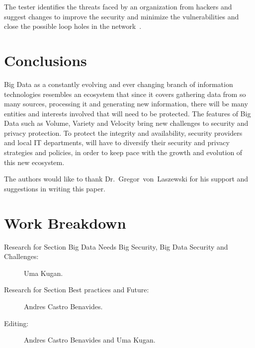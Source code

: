 The  tester identifies the threats faced by an organization from
hackers and suggest changes to improve the security and minimize
the vulnerabilities and close the possible loop holes in the
network~\cite{shivayogimathoverview}.


\section{Conclusions}

Big Data as a constantly evolving and ever changing branch of
information technologies resembles an ecosystem that since
it covers gathering data from so many sources, processing
it and generating new information, there will be many entities 
and interests involved that will need to be protected. The 
features of Big Data such as Volume, Variety and Velocity
bring new challenges to security and privacy protection. 
To protect the integrity and availability, security providers
and local IT departments, will have to diversify their security
and privacy strategies and policies, in order to keep pace with
the growth and evolution of this new ecosystem.

\begin{acks}
The authors would like to thank Dr.~Gregor~von~Laszewski for his 
support and suggestions in writing this paper.
\end{acks}




\newpage

\appendix

\section{Work Breakdown}

\begin{description}

\item[Research for Section Big Data Needs Big Security, Big Data Security and Challenges:] Uma Kugan.

\item[Research for Section Best practices and Future:] Andres Castro Benavides.

\item[Editing:] Andres Castro Benavides and Uma Kugan.

\end{description}


